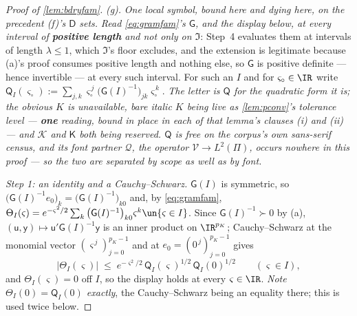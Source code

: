\begin{proof}[Proof of \cref{lem:bdryfam}]
\emph{(g).} \emph{One local symbol, bound here and dying here, on the precedent \textup{(f)}'s
$\mathsf D$ sets.} \emph{Read \eqref{eq:gramfam}'s $\mathsf G$, and the display below, at every interval
of \textbf{positive length} and not only on $\mathfrak I$}: Step~4 evaluates them at intervals of length
$\lambda\le1$, which $\mathfrak I$'s floor excludes, and the extension is legitimate because
\textup{(a)}'s proof consumes positive length and nothing else, so $\mathsf G$ is positive definite ---
hence invertible --- at every such interval. For such an $I$ and for $\varsigma_\circ\in\IR$ write
$\mathsf Q_I(\varsigma_\circ):=\sum_{j,k}\varsigma_\circ^{\,j}\big(\mathsf G(I)^{-1}\big)_{jk}
\varsigma_\circ^{\,k}$. \emph{The letter is $\mathsf Q$ for the quadratic form it is; the obvious $K$ is unavailable, bare
italic $K$ being live as \cref{lem:pconv}'s tolerance level --- \textbf{one} reading, bound in place in
each of that lemma's clauses \textup{(i)} and \textup{(ii)} --- and $\mathcal K$ and $\mathsf K$ both
being reserved.
$\mathsf Q$ is free on the corpus's own sans-serif census, and its font partner $\mathcal Q$, the
operator $\mathcal V\to L^{2}(\Pi)$, occurs nowhere in this proof --- so the two are separated by
scope as well as by font.}

\emph{Step 1: an identity and a Cauchy--Schwarz.} $\mathsf G(I)$ is symmetric, so
$\big(\mathsf G(I)^{-1}e_0\big)_k=\big(\mathsf G(I)^{-1}\big)_{k0}$ and, by \eqref{eq:gramfam},
$\Theta_I(\varsigma)=e^{-\varsigma^{2}/2}\sum_k\big(\mathsf G(I)^{-1}\big)_{k0}\varsigma^{k}\un\{\varsigma\in I\}$.
Since $\mathsf G(I)^{-1}\succ0$ by (a), $(\mathsf u,\mathsf y)\mapsto\mathsf u'\mathsf G(I)^{-1}\mathsf y$
is an inner product on $\IR^{p_K}$; Cauchy--Schwarz at the monomial vector
$(\varsigma^{\,j})_{j=0}^{p_K-1}$ and at $e_0=(0^{\,j})_{j=0}^{p_K-1}$ gives
\begin{equation*}
\big|\Theta_I(\varsigma)\big|\;\le\;e^{-\varsigma^{2}/2}\,\mathsf Q_I(\varsigma)^{1/2}\,\mathsf Q_I(0)^{1/2}
\qquad(\varsigma\in I),
\end{equation*}
and $\Theta_I(\varsigma)=0$ off $I$, so the display holds at every $\varsigma\in\IR$. \emph{Note
$\Theta_I(0)=\mathsf Q_I(0)$ exactly}, the Cauchy--Schwarz being an equality there; this is used twice
below.


\end{proof}

